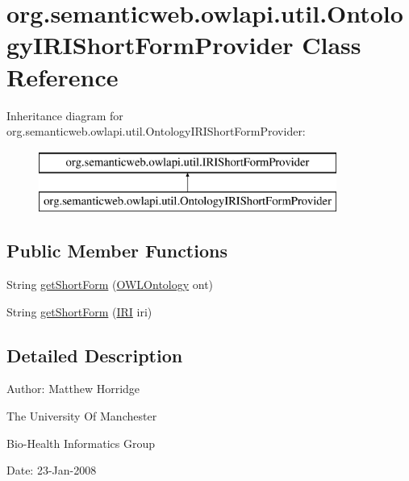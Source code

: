 \hypertarget{classorg_1_1semanticweb_1_1owlapi_1_1util_1_1_ontology_i_r_i_short_form_provider}{\section{org.\-semanticweb.\-owlapi.\-util.\-Ontology\-I\-R\-I\-Short\-Form\-Provider Class Reference}
\label{classorg_1_1semanticweb_1_1owlapi_1_1util_1_1_ontology_i_r_i_short_form_provider}
}
Inheritance diagram for org.\-semanticweb.\-owlapi.\-util.\-Ontology\-I\-R\-I\-Short\-Form\-Provider\-:\begin{figure}[H]
\begin{center}
\leavevmode
\includegraphics[height=2.000000cm]{classorg_1_1semanticweb_1_1owlapi_1_1util_1_1_ontology_i_r_i_short_form_provider}
\end{center}
\end{figure}
\subsection*{Public Member Functions}
\begin{DoxyCompactItemize}
\item 
String \hyperlink{classorg_1_1semanticweb_1_1owlapi_1_1util_1_1_ontology_i_r_i_short_form_provider_ab851165524fa01ea5a1f9b23a1ae5120}{get\-Short\-Form} (\hyperlink{interfaceorg_1_1semanticweb_1_1owlapi_1_1model_1_1_o_w_l_ontology}{O\-W\-L\-Ontology} ont)
\item 
String \hyperlink{classorg_1_1semanticweb_1_1owlapi_1_1util_1_1_ontology_i_r_i_short_form_provider_af1858811c917531747afe56290b3b2d4}{get\-Short\-Form} (\hyperlink{classorg_1_1semanticweb_1_1owlapi_1_1model_1_1_i_r_i}{I\-R\-I} iri)
\end{DoxyCompactItemize}


\subsection{Detailed Description}
Author\-: Matthew Horridge\par
 The University Of Manchester\par
 Bio-\/\-Health Informatics Group\par
 Date\-: 23-\/\-Jan-\/2008\par
\par
 


